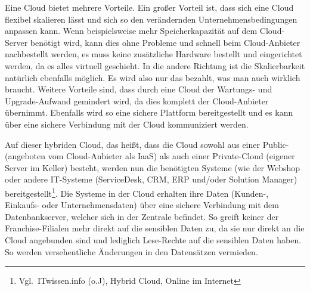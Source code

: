 Eine Cloud bietet mehrere Vorteile. Ein großer Vorteil ist, dass sich
eine Cloud flexibel skalieren lässt und sich so den verändernden
Unternehmensbedingungen anpassen kann. Wenn beispielsweise mehr
Speicherkapazität auf dem Cloud-Server benötigt wird, kann dies ohne
Probleme und schnell beim Cloud-Anbieter nachbestellt werden, es muss
keine zusätzliche Hardware bestellt und eingerichtet werden, da es
alles virtuell geschieht. In die andere Richtung ist die
Skalierbarkeit natürlich ebenfalls möglich. Es wird also nur das
bezahlt, was man auch wirklich braucht. Weitere Vorteile sind, dass
durch eine Cloud der Wartungs- und Upgrade-Aufwand gemindert wird, da
dies komplett der Cloud-Anbieter übernimmt. Ebenfalls wird so eine
sichere Plattform bereitgestellt und es kann über eine sichere
Verbindung mit der Cloud kommuniziert werden.

Auf dieser hybriden Cloud, das heißt, dass die Cloud sowohl aus einer
Public- (angeboten vom Cloud-Anbieter als \acrshort{IaaS}) als auch einer
Private-Cloud (eigener Server im Keller) besteht, werden nun die
benötigten Systeme (wie der Webshop oder andere IT-Systeme
(ServiceDesk, CRM, ERP und/oder Solution Manager)
bereitgestellt\footnote{Vgl.~ITwissen.info (o.J), Hybrid Cloud,
  Online im Internet}. Die Systeme in der Cloud erhalten ihre Daten
(Kunden-, Einkaufs- oder Unternehmensdaten) über eine sichere
Verbindung mit dem Datenbankserver, welcher sich in der Zentrale
befindet. So greift keiner der Franchise-Filialen mehr direkt auf die
sensiblen Daten zu, da sie nur direkt an die Cloud angebunden sind und
lediglich Lese-Rechte auf die sensiblen Daten haben. So werden
versehentliche Änderungen in den Datensätzen vermieden.

